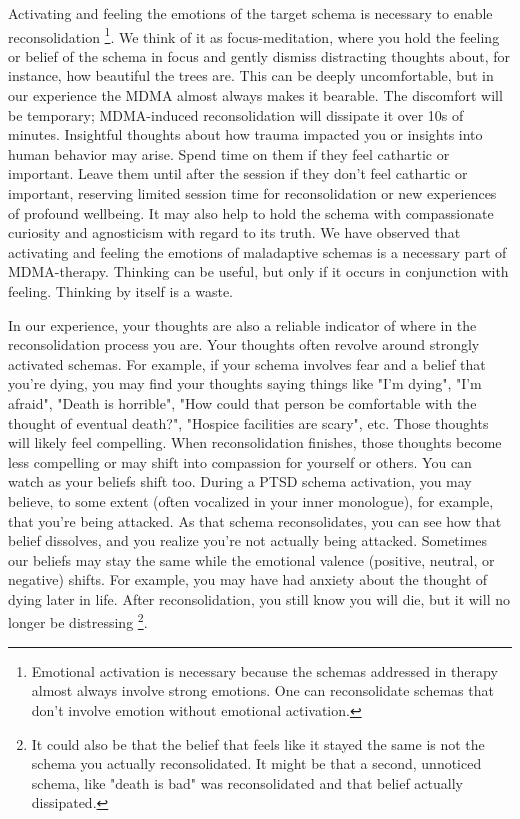 \documentclass[12pt,letterpaper]{book}
\begin{document}
Activating and feeling the emotions of the target schema is necessary to enable reconsolidation \cite{ecker2015misunderstood} \footnote{Emotional activation is necessary because the schemas addressed in therapy almost always involve strong emotions. One can reconsolidate schemas that don't involve emotion without emotional activation.}. We think of it as focus-meditation, where you hold the feeling or belief of the schema in focus and gently dismiss distracting thoughts about, for instance, how beautiful the trees are. This can be deeply uncomfortable, but in our experience the MDMA almost always makes it bearable. The discomfort will be temporary; MDMA-induced reconsolidation will dissipate it over 10s of minutes. Insightful thoughts about how trauma impacted you or insights into human behavior may arise. Spend time on them if they feel cathartic or important. Leave them until after the session if they don't feel cathartic or important, reserving limited session time for reconsolidation or new experiences of profound wellbeing. It may also help to hold the schema with compassionate curiosity and agnosticism with regard to its truth. We have observed that activating and feeling the emotions of maladaptive schemas is a necessary part of MDMA-therapy. Thinking can be useful, but only if it occurs in conjunction with feeling. Thinking by itself is a waste.

In our experience, your thoughts are also a reliable indicator of where in the reconsolidation process you are. Your thoughts often revolve around strongly activated schemas. For example, if your schema involves fear and a belief that you're dying, you may find your thoughts saying things like "I'm dying", "I'm afraid", "Death is horrible", "How could that person be comfortable with the thought of eventual death?", "Hospice facilities are scary", etc. Those thoughts will likely feel compelling. When reconsolidation finishes, those thoughts become less compelling or may shift into compassion for yourself or others. You can watch as your beliefs shift too. During a PTSD schema activation, you may believe, to some extent (often vocalized in your inner monologue), for example, that you're being attacked. As that schema reconsolidates, you can see how that belief dissolves, and you realize you're not actually being attacked. Sometimes our beliefs may stay the same while the emotional valence (positive, neutral, or negative) shifts. For example, you may have had anxiety about the thought of dying later in life. After reconsolidation, you still know you will die, but it will no longer be distressing \footnote{It could also be that the belief that feels like it stayed the same is not the schema you actually reconsolidated. It might be that a second, unnoticed schema, like "death is bad" was reconsolidated and that belief actually dissipated.}.
\end{document}
